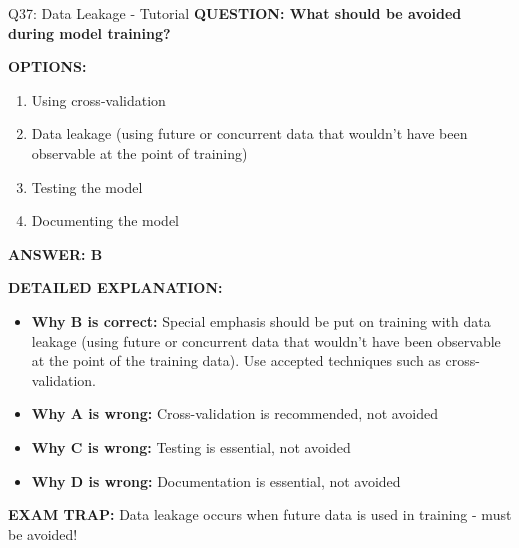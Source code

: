 \documentclass[8pt]{beamer}
\begin{document}
	\begin{frame}{Q37: Data Leakage - Tutorial}
		\fontsize{6.5}{7.5}\selectfont
		\textbf{QUESTION: What should be avoided during model training?}
		
		\vspace{0.1cm}
		\textbf{OPTIONS:}
		\begin{enumerate}
			\item Using cross-validation
			\item Data leakage (using future or concurrent data that wouldn't have been observable at the point of training)
			\item Testing the model
			\item Documenting the model
		\end{enumerate}
		
		\vspace{0.1cm}
		\textcolor{myblue}{\textbf{ANSWER: B}}
		
		\vspace{0.1cm}
		\textbf{DETAILED EXPLANATION:}
		\begin{itemize}
			\item \textbf{Why B is correct:} Special emphasis should be put on training with data leakage (using future or concurrent data that wouldn't have been observable at the point of the training data). Use accepted techniques such as cross-validation.
			\item \textbf{Why A is wrong:} Cross-validation is recommended, not avoided
			\item \textbf{Why C is wrong:} Testing is essential, not avoided
			\item \textbf{Why D is wrong:} Documentation is essential, not avoided
		\end{itemize}
		
		\textcolor{myred}{\textbf{EXAM TRAP:}} Data leakage occurs when \textcolor{myblue}{future data is used in training} - must be avoided!
	\end{frame}
	
\end{document}
